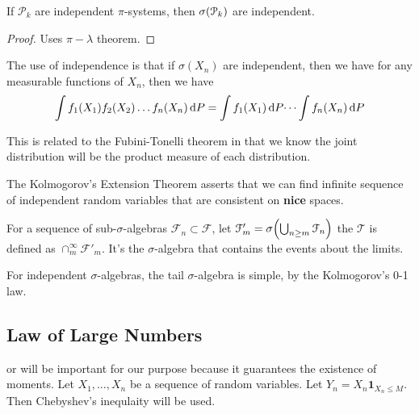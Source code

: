 \begin{thm}
    If \(\mathcal{P}_{k}\) are independent \(\pi\)-systems, then \(\sigma\pqty{\mathcal{P}_{k}}\) are independent. 
\end{thm}

\begin{proof}
    Uses \(\pi- \lambda\) theorem.
\end{proof}



The use of independence is that if \(\sigma(X_{n})\) are independent, then we have for any measurable functions of \(X_{n}\), then we have 
\begin{equation*}
    \int f_{1}\pqty{X_{1}} f_{2}\pqty{X_{2}} \dots f_{n}\pqty{X_{n}} \dd{P} = \int f_{1}\pqty{X_{1}} \dd{P} \dots \int f_{n}\pqty{X_{n}} \dd{P}
\end{equation*}

This is related to the Fubini-Tonelli theorem in that we know the joint distribution will be the product measure of each distribution.

The Kolmogorov's Extension Theorem asserts that we can find infinite sequence of independent random variables that are consistent on \textbf{nice} spaces. 


For a sequence of sub-\(\sigma\)-algebras \(\mathcal{F}_{n} \subset \mathcal{F}\), let \(\mathcal{F}'_{m} = \sigma\pqty{\cup_{n\geq m} \mathcal{F}_{n}}\) the  \(\mathcal{T}\) is defined as \(\cap_{m}^{\infty} \mathcal{F}'_{m}\). It's the \(\sigma\)-algebra that contains the events about the limits. 

For independent \(\sigma\)-algebras, the tail \(\sigma\)-algebra is simple, by the Kolmogorov's 0-1 law. 

\begin{thm}
    
\end{thm}
\subsection{Law of Large Numbers}


 or  will be important for our purpose because it guarantees the existence of moments. Let \(X_{1},\dots, X_{n}\) be a sequence of random variables. Let \(Y_{n} = X_{n}\mathbf{1}_{X_{n} \leq M}\). Then Chebyshev's inequlaity will be used.

